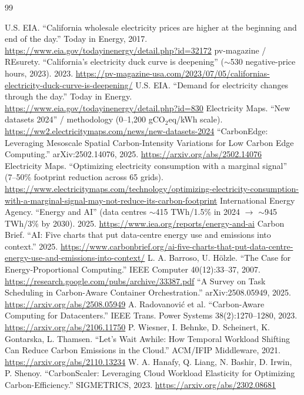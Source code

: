 \documentclass{article}
\begin{document}
\begin{thebibliography}{99}

 U.S. EIA. ``California wholesale electricity prices are higher at the beginning and end of the day.'' Today in Energy, 2017. \url{https://www.eia.gov/todayinenergy/detail.php?id=32172}
 pv-magazine / REsurety. ``California's electricity duck curve is deepening'' ($\sim$530 negative-price hours, 2023). 2023. \url{https://pv-magazine-usa.com/2023/07/05/californias-electricity-duck-curve-is-deepening/}
 U.S. EIA. ``Demand for electricity changes through the day.'' Today in Energy. \url{https://www.eia.gov/todayinenergy/detail.php?id=830}
 Electricity Maps. ``New datasets 2024'' / methodology (0--1,200 gCO$_2$eq/kWh scale). \url{https://ww2.electricitymaps.com/news/new-datasets-2024}
 ``CarbonEdge: Leveraging Mesoscale Spatial Carbon-Intensity Variations for Low Carbon Edge Computing.'' arXiv:2502.14076, 2025. \url{https://arxiv.org/abs/2502.14076}
 Electricity Maps. ``Optimizing electricity consumption with a marginal signal'' (7--50\% footprint reduction across 65 grids). \url{https://www.electricitymaps.com/technology/optimizing-electricity-consumption-with-a-marginal-signal-may-not-reduce-its-carbon-footprint}
 International Energy Agency. ``Energy and AI'' (data centres $\sim$415 TWh/1.5\% in 2024 $\to$ $\sim$945 TWh/3\% by 2030). 2025. \url{https://www.iea.org/reports/energy-and-ai}
 Carbon Brief. ``AI: Five charts that put data-centre energy use and emissions into context.'' 2025. \url{https://www.carbonbrief.org/ai-five-charts-that-put-data-centre-energy-use-and-emissions-into-context/}
 L. A. Barroso, U. H\"olzle. ``The Case for Energy-Proportional Computing.'' IEEE Computer 40(12):33--37, 2007. \url{https://research.google.com/pubs/archive/33387.pdf}
 ``A Survey on Task Scheduling in Carbon-Aware Container Orchestration.'' arXiv:2508.05949, 2025. \url{https://arxiv.org/abs/2508.05949}
 A. Radovanovi\'c et al. ``Carbon-Aware Computing for Datacenters.'' IEEE Trans. Power Systems 38(2):1270--1280, 2023. \url{https://arxiv.org/abs/2106.11750}
 P. Wiesner, I. Behnke, D. Scheinert, K. Gontarska, L. Thamsen. ``Let's Wait Awhile: How Temporal Workload Shifting Can Reduce Carbon Emissions in the Cloud.'' ACM/IFIP Middleware, 2021. \url{https://arxiv.org/abs/2110.13234}
 W. A. Hanafy, Q. Liang, N. Bashir, D. Irwin, P. Shenoy. ``CarbonScaler: Leveraging Cloud Workload Elasticity for Optimizing Carbon-Efficiency.'' SIGMETRICS, 2023. \url{https://arxiv.org/abs/2302.08681}

\end{thebibliography}
\end{document}
